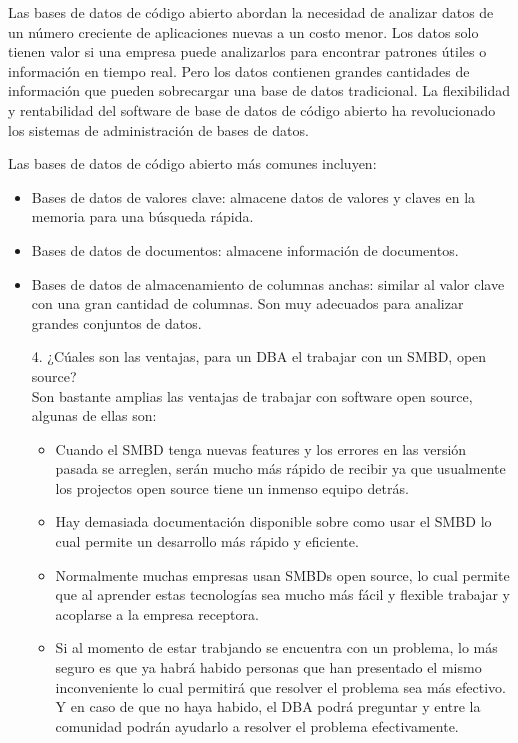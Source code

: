 \documentclass{article}
\begin{document}
Las bases de datos de código abierto abordan la necesidad de analizar datos de un número creciente de aplicaciones nuevas a un costo menor.  Los datos solo tienen valor si una empresa puede analizarlos para encontrar patrones útiles o información en tiempo real. Pero los datos contienen grandes cantidades de información que pueden sobrecargar una base de datos tradicional. La flexibilidad y rentabilidad del software de base de datos de código abierto ha revolucionado los sistemas de administración de bases de datos. 

Las bases de datos de código abierto más comunes incluyen: 
\begin{itemize}
    \item Bases de datos de valores clave: almacene datos de valores y claves en la memoria para una búsqueda rápida. 
    \item Bases de datos de documentos: almacene información de documentos. 
    \item Bases de datos de almacenamiento de columnas anchas: similar al valor clave con una gran cantidad de columnas. Son muy adecuados para analizar grandes conjuntos de datos.
\end{itemize}
    
\begin{itemize}
    \item[4.]¿C\'uales son las ventajas, para un DBA el trabajar con un SMBD, open source?\\
    Son bastante amplias las ventajas de trabajar con software open source, algunas de ellas son:
    
    \begin{itemize}
        \item Cuando el SMBD tenga nuevas features y los errores en las versión pasada se arreglen, serán mucho más rápido de recibir ya que usualmente los projectos open source tiene un inmenso equipo detrás.
        
        \item Hay demasiada documentación disponible sobre como usar el SMBD lo cual permite un desarrollo más rápido y eficiente.
        
        \item Normalmente muchas empresas usan SMBDs open source, lo cual permite que al aprender estas tecnologías sea mucho más fácil y flexible trabajar y acoplarse a la empresa receptora.
        
        \item Si al momento de estar trabjando se encuentra con un problema, lo más seguro es que ya habrá habido personas que han presentado el mismo inconveniente lo cual permitirá que resolver el problema sea más efectivo. Y en caso de que no haya habido, el DBA podrá preguntar y entre la comunidad podrán ayudarlo a resolver el problema efectivamente. 
    \end{itemize}
\end{itemize}
     
\end{document}

